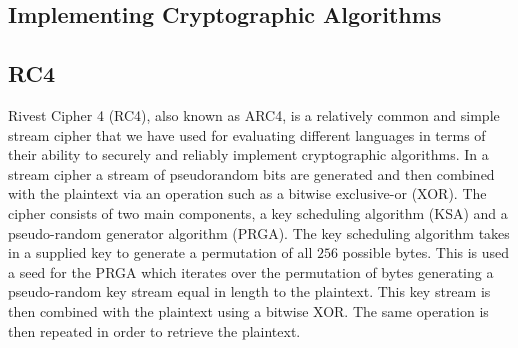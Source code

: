 \subsection{Implementing Cryptographic Algorithms}

\subsection{RC4}

Rivest Cipher 4 (RC4), also known as ARC4, is a relatively common and simple stream cipher that we have 
used for evaluating different languages in terms of their ability to securely and reliably implement 
cryptographic algorithms. In a stream cipher a stream of pseudorandom bits are generated and then combined 
with the plaintext via an operation such as a bitwise exclusive-or (XOR). The cipher consists of two main 
components, a key scheduling algorithm (KSA) and a pseudo-random generator algorithm (PRGA). The key scheduling algorithm 
takes in a supplied key to generate a permutation of all $256$ possible bytes. This is used a seed for the 
PRGA which iterates over the permutation of bytes generating a pseudo-random key stream equal in length to 
the plaintext. This key stream is then combined with the plaintext using a bitwise XOR. The same operation is 
then repeated in order to retrieve the plaintext.
